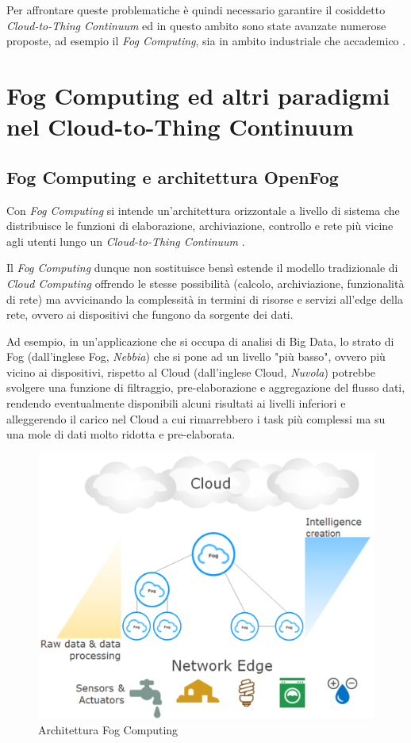 Per affrontare queste problematiche è quindi necessario garantire il cosiddetto \textit{Cloud-to-Thing Continuum} ed in questo ambito sono state avanzate numerose proposte, ad esempio il \textit{Fog Computing}, sia in ambito industriale che accademico \cite{OpenFogReferenceArchitecture, FogComputingInIoT}. 


\section{Fog Computing ed altri paradigmi nel Cloud-to-Thing Continuum}

\subsection{Fog Computing e architettura OpenFog}

Con \textit{Fog Computing} si intende un'architettura orizzontale a livello di sistema che distribuisce le funzioni di elaborazione, archiviazione, controllo e rete più vicine agli utenti lungo un \textit{Cloud-to-Thing Continuum} \cite{OpenFogReferenceArchitecture}.

Il \textit{Fog Computing} dunque non sostituisce bensì estende il modello tradizionale di \textit{Cloud Computing} offrendo le stesse possibilità (calcolo, archiviazione, funzionalità di rete) ma avvicinando la complessità in termini di risorse e servizi all'edge della rete, ovvero ai dispositivi che fungono da sorgente dei dati. 

Ad esempio, in un'applicazione che si occupa di analisi di Big Data, lo strato di Fog (dall'inglese Fog, \textit{Nebbia}) che si pone ad un livello "più basso", ovvero più vicino ai dispositivi, rispetto al Cloud (dall'inglese Cloud, \textit{Nuvola}) potrebbe svolgere una funzione di filtraggio, pre-elaborazione e aggregazione del flusso dati, rendendo eventualmente disponibili alcuni risultati ai livelli inferiori e alleggerendo il carico nel Cloud a cui rimarrebbero i task più complessi ma su una mole di dati molto ridotta e pre-elaborata.

\begin{figure}[!ht]
  \includegraphics[width=12cm]{images/FogCloudToThingContinuum}
  \centering
  \caption{Architettura Fog Computing \cite{OpenFogReferenceArchitecture}}
  \label{fig:temporizzazione_arbitraggio}
\end{figure}


